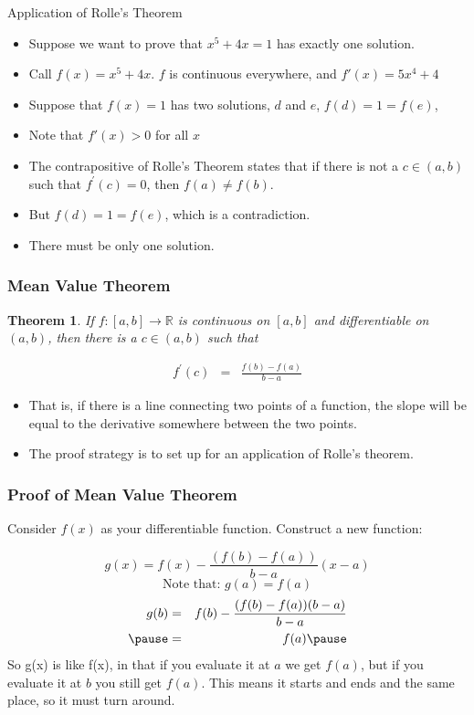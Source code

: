\documentclass{beamer}
\newtheorem{thm}{Theorem}
\numberwithin{equation}{section}
\begin{document}
\begin{frame}{Application of Rolle's Theorem}
\begin{itemize}
\item Suppose we want to prove that $x^5+4x=1$ has exactly one solution.\pause
\item Call $f(x)=x^5+4x$.  $f$ is continuous everywhere, and $f'(x)=5x^4+4$\pause
\item Suppose that $f(x)=1$ has two solutions, $d$ and $e$, $ f(d) = 1 = f(e)$,
\item Note that $f'(x)>0$ for all $x$\pause
\item The contrapositive of Rolle's Theorem states that if there is not a $c \in (a, b)$ such that $f^{'}(c) = 0$, then $f(a) \neq f(b) $.\pause
\item But $ f(d) = 1 = f(e)$, which is a contradiction.
\item There must be only one solution.
\end{itemize}
\end{frame}

\begin{frame}
\frametitle{Mean Value Theorem} 

\begin{thm} If $f:[a,b] \rightarrow \mathbb{R}$ is continuous on $[a,b]$ and differentiable on $(a,b)$, then there is a $c \in (a,b)$ such that 

\begin{eqnarray}
f^{'}(c) & = & \frac{f(b) - f(a) } { b - a} \nonumber 
\end{eqnarray}
\end{thm}\pause

\begin{itemize}
\item That is, if there is a line connecting two points of a function, the slope will be equal to the derivative somewhere between the two points.
\item The proof strategy is to set up for an application of Rolle's theorem.
\end{itemize}
\end{frame}




\begin{frame}
\frametitle{Proof of Mean Value Theorem} 
Consider $f(x)$ as your differentiable function.  Construct a new function:

$$g(x)=f(x)-\frac{(f(b)-f(a))}{b-a}(x-a)$$\pause
$$\text{Note that: }g(a)=f(a)$$\pause 
\begin{eqnarray}
g(b)&=&f(b)-\frac{(f(b)-f(a))(b-a)}{b-a} \nonumber \\ \pause
&=&f(a)\nonumber\pause 
\end{eqnarray}
So g(x) is like f(x), in that if you evaluate it at $a$ we get $f(a)$, but if you evaluate it at $b$ you still get $f(a)$.  This means it starts and ends and the same place, so it must turn around.
\end{frame}
\end{document}
